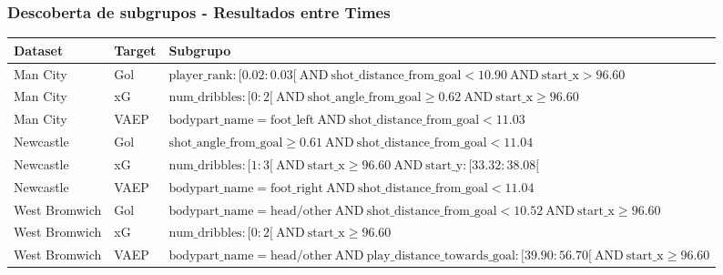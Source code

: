\documentclass{beamer}
\begin{document}
\begin{frame}
\frametitle{Descoberta de subgrupos - Resultados entre Times}
    \begin{table}[H]
        \centering
        \small
        \begin{tabularx}{\textwidth}{|l|l|X|}
            \hline
            \textbf{Dataset} & \textbf{Target} & \textbf{Subgrupo} \\
            \hline
            Man City & Gol & $ \text{player\_rank} : [0.02:0.03[ \ \text{AND} \ \text{shot\_distance\_from\_goal} < 10.90 \ \text{AND} \ \text{start\_x} > 96.60 $ \\
            \hline
            Man City & xG & $ \text{num\_dribbles} : [0:2[ \ \text{AND} \ \text{shot\_angle\_from\_goal} \geq 0.62 \ \text{AND} \ \text{start\_x} \geq 96.60 $ \\
            \hline
            Man City & VAEP & $ \text{bodypart\_name} = \text{foot\_left} \ \text{AND} \ \text{shot\_distance\_from\_goal} < 11.03 $ \\
            \hline
            Newcastle & Gol & $ \text{shot\_angle\_from\_goal} \geq 0.61 \ \text{AND} \ \text{shot\_distance\_from\_goal} < 11.04 $ \\
            \hline
            Newcastle & xG & $ \text{num\_dribbles} : [1:3[ \ \text{AND} \ \text{start\_x} \geq 96.60 \ \text{AND} \ \text{start\_y} : [33.32:38.08[ $ \\
            \hline
            Newcastle & VAEP & $ \text{bodypart\_name} = \text{foot\_right} \ \text{AND} \ \text{shot\_distance\_from\_goal} < 11.04 $ \\
            \hline
            West Bromwich & Gol & $ \text{bodypart\_name} = \text{head/other} \ \text{AND} \ \text{shot\_distance\_from\_goal} < 10.52 \ \text{AND} \ \text{start\_x} \geq 96.60 $ \\
            \hline
            West Bromwich & xG & $ \text{num\_dribbles} : [0:2[ \ \text{AND} \ \text{start\_x} \geq 96.60 $ \\
            \hline
            West Bromwich & VAEP & $ \text{bodypart\_name} = \text{head/other} \ \text{AND} \ \text{play\_distance\_towards\_goal} : [39.90:56.70[ \ \text{AND} \ \text{start\_x} \geq 96.60 $ \\
            \hline
        \end{tabularx}
    \end{table}
\end{frame}
\end{document}
